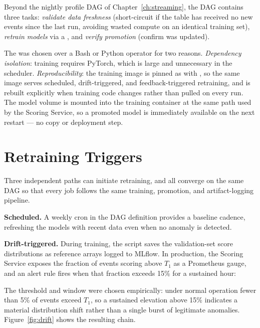 Beyond the nightly profile DAG of Chapter~\ref{ch:streaming}, the  DAG contains three tasks: \emph{validate data freshness} (short-circuit if the  table has received no new events since the last run, avoiding wasted compute on an identical training set), \emph{retrain models} via a , and \emph{verify promotion} (confirm  was updated).

The  was chosen over a Bash or Python operator for two reasons. \emph{Dependency isolation}: training requires PyTorch, which is large and unnecessary in the scheduler. \emph{Reproducibility}: the training image is pinned as  with , so the same image serves scheduled, drift-triggered, and feedback-triggered retraining, and is rebuilt explicitly when training code changes rather than pulled on every run. The model volume is mounted into the training container at the same path used by the Scoring Service, so a promoted model is immediately available on the next restart --- no copy or deployment step.

\section{Retraining Triggers}

Three independent paths can initiate retraining, and all converge on the same  DAG so that every job follows the same training, promotion, and artifact-logging pipeline.

\textbf{Scheduled.} A weekly cron in the DAG definition provides a baseline cadence, refreshing the models with recent data even when no anomaly is detected.

\textbf{Drift-triggered.} During training, the script saves the validation-set score distributions as reference arrays logged to MLflow. In production, the Scoring Service exposes the fraction of events scoring above $T_1$ as a Prometheus gauge, and an alert rule fires when that fraction exceeds 15\% for a sustained hour:

\begin{center}
\end{center}

The threshold and window were chosen empirically: under normal operation fewer than 5\% of events exceed $T_1$, so a sustained elevation above 15\% indicates a material distribution shift rather than a single burst of legitimate anomalies. Figure~\ref{fig:drift} shows the resulting chain.

